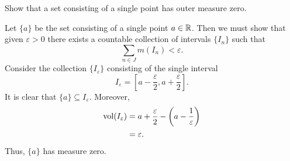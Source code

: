 \begin{problem}
  Show that a set consisting of a single point has outer measure zero.
\end{problem}
\begin{solution}
  Let $\{a\}$ be the set consisting of a single point $a\in\mathbb{R}$. Then we
  must show that given $\varepsilon>0$ there exists a countable collection
  of intervals $\{I_n\}$ such that
  \[
    \sum_{n\in J} m(I_n)<\varepsilon.
  \]
  Consider the collection $\{I_\varepsilon\}$ consisting of the single
  interval
  \[
    I_\varepsilon=
    \left[a-\frac{\varepsilon}{2},a+\frac{\varepsilon}{2}\right].
  \]
  It is clear that $\{a\}\subseteq I_\varepsilon$. Moreover,
  \begin{align*}
    \operatorname{vol}(I_\varepsilon)
    &=a+\frac{\varepsilon}{2}-\left(a-\frac{1}{\varepsilon}\right)\\
    &=\varepsilon.
  \end{align*}
  Thus, $\{a\}$ has measure zero.
\end{solution}

